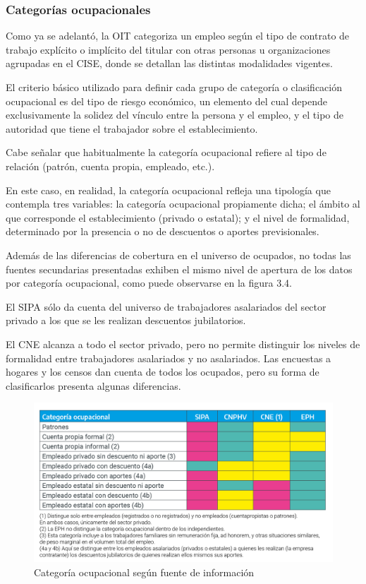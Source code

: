 \documentclass[
  openany]{book}
\begin{document}
\hypertarget{categoruxedas-ocupacionales}{%
\subsubsection{Categorías ocupacionales}\label{categoruxedas-ocupacionales}}

Como ya se adelantó, la OIT categoriza un empleo según el tipo de contrato de trabajo explícito o implícito del titular con otras personas u organizaciones agrupadas en el CISE, donde se detallan las distintas modalidades vigentes.

El criterio básico utilizado para definir cada grupo de categoría o clasificación ocupacional es del tipo de riesgo económico, un elemento del cual depende exclusivamente la solidez del vínculo entre la persona y el empleo, y el tipo de autoridad que tiene el trabajador sobre el establecimiento.

Cabe señalar que habitualmente la categoría ocupacional refiere al tipo de relación (patrón, cuenta propia, empleado, etc.).

En este caso, en realidad, la categoría ocupacional refleja una tipología que contempla tres variables: la categoría ocupacional propiamente dicha; el ámbito al que corresponde el establecimiento (privado o estatal); y el nivel de formalidad, determinado por la presencia o no de descuentos o aportes previsionales.

Además de las diferencias de cobertura en el universo de ocupados, no todas las fuentes secundarias presentadas exhiben el mismo nivel de apertura de los datos por categoría ocupacional, como puede observarse en la figura 3.4.

El SIPA sólo da cuenta del universo de trabajadores asalariados del sector privado a los que se les realizan descuentos jubilatorios.

El CNE alcanza a todo el sector privado, pero no permite distinguir los niveles de formalidad entre trabajadores asalariados y no asalariados.
Las encuestas a hogares y los censos dan cuenta de todos los ocupados, pero su forma de clasificarlos presenta algunas diferencias.

\begin{figure}

{\centering \includegraphics[width=1\linewidth]{imagenes/figura3.3} 

}

\caption{Categoría ocupacional según fuente de información}\label{fig:empleofuentes3}
\end{figure}
\end{document}
